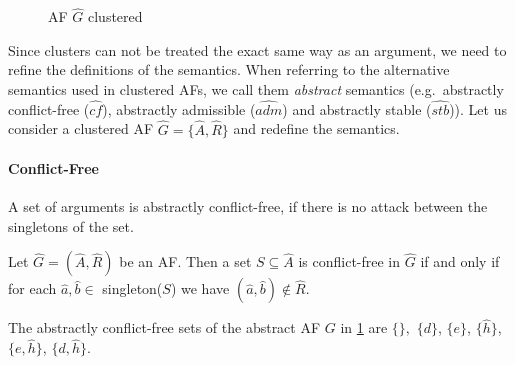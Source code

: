 \begin{figure}[h]
    \centering
    \caption{\ac{AF} $\hat{G}$ clustered}
    \label{af:backgroundExampleClusterSpurious}
\end{figure}


Since clusters can not be treated the exact same way as an argument, we need to refine the definitions of the semantics. When referring to the alternative semantics used in clustered AFs, we call them \emph{abstract} semantics (e.g.\ abstractly conflict-free ($\hat{cf}$), abstractly admissible ($\hat{adm}$) and abstractly stable ($\hat{stb}$)). Let us consider a clustered AF $\hat{G}=\{\hat{A}, \hat{R}\}$ and redefine the semantics.

\paragraph{Conflict-Free} A set of arguments is abstractly conflict-free, if there is no attack between the singletons of the set.

\begin{definition}
    Let $\hat{G}=(\hat{A},\hat{R})$ be an AF. Then a set  $S \subseteq \hat{A}$ is conflict-free in $\hat{G}$ if and only if for each $\hat{a}, \hat{b} \in$ singleton($S$) we have $(\hat{a}, \hat{b}) \not\in \hat{R}$.
\end{definition}

\begin{example}
    The abstractly conflict-free sets of the abstract AF $G$ in \cref{af:backgroundExampleClusterSpurious} are 
    $\{\},$
    $\{d\}$,
    $\{e\}$,
    $\{\hat{h}\}$,
    $\{e, \hat{h}\}$,
    $\{d, \hat{h}\}$.
\end{example}




